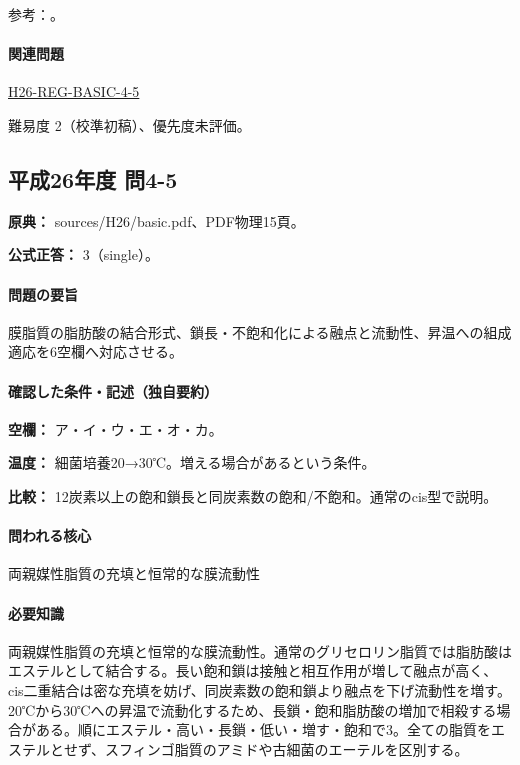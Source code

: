 \par 参考：\cite{bio_membrane}。

\paragraph{関連問題} \hyperref[q:h26-reg-basic-4-5]{H26-REG-BASIC-4-5}

\par 難易度 2（校準初稿）、優先度未評価。

\subsection{平成26年度 問4-5}
\label{q:h26-reg-basic-4-5}

\noindent\textbf{原典：} sources/H26/basic.pdf、PDF物理15頁。

\textbf{公式正答：} 3（single）。

\paragraph{問題の要旨} 膜脂質の脂肪酸の結合形式、鎖長・不飽和化による融点と流動性、昇温への組成適応を6空欄へ対応させる。

\paragraph{確認した条件・記述（独自要約）}\mbox{}\par

\noindent\textbf{空欄：} ア・イ・ウ・エ・オ・カ。\par

\noindent\textbf{温度：} 細菌培養20→30℃。増える場合があるという条件。\par

\noindent\textbf{比較：} 12炭素以上の飽和鎖長と同炭素数の飽和/不飽和。通常のcis型で説明。\par

\paragraph{問われる核心} 両親媒性脂質の充填と恒常的な膜流動性

\paragraph{必要知識} 両親媒性脂質の充填と恒常的な膜流動性。通常のグリセロリン脂質では脂肪酸はエステルとして結合する。長い飽和鎖は接触と相互作用が増して融点が高く、cis二重結合は密な充填を妨げ、同炭素数の飽和鎖より融点を下げ流動性を増す。20℃から30℃への昇温で流動化するため、長鎖・飽和脂肪酸の増加で相殺する場合がある。順にエステル・高い・長鎖・低い・増す・飽和で3。全ての脂質をエステルとせず、スフィンゴ脂質のアミドや古細菌のエーテルを区別する。

